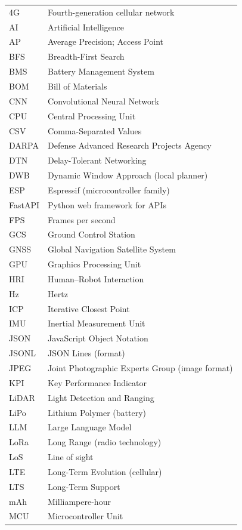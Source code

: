 \documentclass{thesis-report}
\begin{document}
\begin{longtable}{@{}ll@{}}
4G & Fourth-generation cellular network \\
AI & Artificial Intelligence \\
AP & Average Precision; Access Point \\
BFS & Breadth-First Search \\
BMS & Battery Management System \\
BOM & Bill of Materials \\
CNN & Convolutional Neural Network \\
CPU & Central Processing Unit \\
CSV & Comma-Separated Values \\
DARPA & Defense Advanced Research Projects Agency \\
DTN & Delay-Tolerant Networking \\
DWB & Dynamic Window Approach (local planner) \\
ESP & Espressif (microcontroller family) \\
FastAPI & Python web framework for APIs \\
FPS & Frames per second \\
GCS & Ground Control Station \\
GNSS & Global Navigation Satellite System \\
GPU & Graphics Processing Unit \\
HRI & Human--Robot Interaction \\
Hz & Hertz \\
ICP & Iterative Closest Point \\
IMU & Inertial Measurement Unit \\
JSON & JavaScript Object Notation \\
JSONL & JSON Lines (format) \\
JPEG & Joint Photographic Experts Group (image format) \\
KPI & Key Performance Indicator \\
LiDAR & Light Detection and Ranging \\
LiPo & Lithium Polymer (battery) \\
LLM & Large Language Model \\
LoRa & Long Range (radio technology) \\
LoS & Line of sight \\
LTE & Long-Term Evolution (cellular) \\
LTS & Long-Term Support \\
mAh & Milliampere-hour \\
MCU & Microcontroller Unit \\

\end{longtable}
\end{document}
